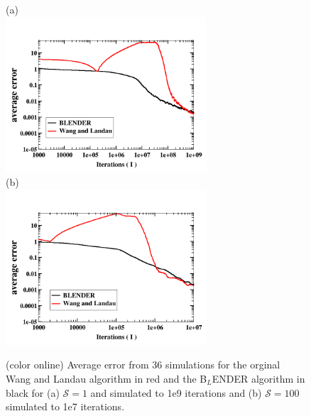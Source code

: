 \documentclass[aps,pre,reprint,superscriptaddress,showkeys]{revtex4-1}
\begin{document}
\begin{figure}[h!]
(a)\\
\includegraphics[width=7.5cm]{./figures/compare_S1_blender_wang_landau.png}\\
(b)\\
\includegraphics[width=7.5cm]{./figures/compare_S100_blender_wang_landau.png}\\
\caption{(color online) Average error from 36 simulations for the orginal Wang and Landau algorithm in red and the B$_L$ENDER  algorithm in black for (a) $\mathcal{S}=1$ and simulated to 1e9 iterations and (b) $\mathcal{S}=100$ simulated to 1e7 iterations. \label{compare_blender_wl}}
\end{figure}
\end{document}

